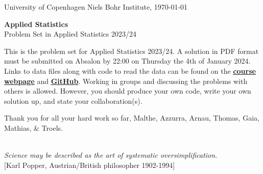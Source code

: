 \documentclass[11pt]{article}
\begin{document}

\noindent
University of Copenhagen \hfill
Niels Bohr Institute, \today \par
\vspace{-2ex}
\noindent
\hrulefill

\vspace{1ex}
\begin{center}
{\bf {\Huge Applied Statistics}}\\
\vspace{1ex}
{\large Problem Set in Applied Statistics 2023/24}
\end{center}

\vspace{0ex}
\noindent
This is the problem set for Applied Statistics 2023/24. A solution in PDF format must be submitted on Absalon by 22:00
on Thursday the 4th of January 2024. Links to data files along with code to read the data can be found on the
  \href{www.nbi.dk/$\sim$petersen/Teaching/AppliedStatistics2023.html}{\bf course webpage} and
  \href{https://github.com/AppliedStatisticsNBI/AppStat2023}{\bf GitHub}.
Working in groups and discussing the problems with others is allowed. However, you should produce your own code,
write your own solution up, and state your collaboration(s).

\vspace{-2ex}
\begin{center}
  Thank you for all your hard work so far, Malthe, Azzurra, Arnau, Thomas, Gaia, Mathias, \& Troels.
\end{center}


\noindent
\hrulefill\\
\emph{Science may be described as the art of systematic oversimplification.}\\
  \phantom{foobar} \hfill [Karl Popper, Austrian/British philosopher 1902-1994]\\[-2ex]

  
\vspace{-2ex}
\noindent
\hrulefill
\end{document}
